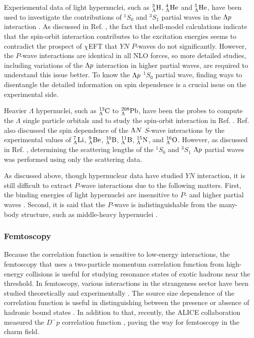 Experiemental data of light hypernuclei, such as ${}_\Lambda^3\rm{H}$, ${}_\Lambda^4\rm{He}$ and ${}_\Lambda^5\rm{He}$, have been used to investigate the contributions of $^1S_0$ and $^3S_1$ partial waves in the $\Lambda p$ interaction \cite{chiEFT-2020}\cite{chiEFT-2020_2}. As discussed in Ref. \cite{chiEFT-2020_2}, the fact that shell-model calculations indicate that the spin-orbit interaction contributes to the excitation energies seems to contradict the prospect of $\chi$EFT that $YN$ $P$-waves do not significantly. However, the $P$-wave interactions are identical in all NLO forces, so more detailed studies, including variations of the $\Lambda p$ interaction in higher partial waves, are required to understand this issue better. To know the $\Lambda p$ $^1S_0$ partial wave, finding ways to disentangle the detailed information on spin dependence is a crucial issue on the experimental side. 

Heavier $\Lambda$ hypernuclei, such as ${}_\Lambda^{13}\rm{C}$ to ${}_\Lambda^{208}\rm{Pb}$, have been the probes to compute the $\Lambda$ single particle orbitals and to study the spin-orbit interaction in Ref. \cite{chiEFT-2009}. Ref. \cite{shell-2005} also discussed the spin dependence of the $\Lambda N$ $S$-wave interactions by the experimental values of ${}_\Lambda^7\rm{Li}$, ${}_\Lambda^9\rm{Be}$, ${}_\Lambda^{10}\rm{B}$, ${}_\Lambda^{11}\rm{B}$, ${}_\Lambda^{15}\rm{N}$, and ${}_\Lambda^{16}\rm{O}$. However, as discussed in Ref. \cite{Lp-1968_Alex}, determining the scattering lengths of the $^1S_0$ and $^3S_1$ $\Lambda p$ partial waves was performed using only the scattering data. %

As discussed above, though hypernuclear data have studied $YN$ interaction, it is still difficult to extract $P$-wave interactions due to the following matters. First, the binding energies of light hypernuclei are insensitive to $P$- and higher partial waves \cite{chiEFT-2020_2}. Second, it is said that the $P$-wave is indistinguishable from the many-body structure, such as middle-heavy hypernuclei \cite{Isaka-2017}. 

\subsubsection{Femtoscopy}
Because the correlation function is sensitive to low-energy interactions, the femtoscopy that uses a two-particle momentum correlation function from high-energy collisions is useful for studying resonance states of exotic hadrons near the threshold. In femtoscopy, various interactions in the strangeness sector have been studied theoretically \cite{fem-th-1, fem-th-2, fem-th-3, fem-th-4, fem-th-5, fem-th-6, fem-th-7, fem-th-8, fem-th-9} and experimentally \cite{fem-ex-1, fem-ex-2, fem-ex-3, fem-ex-4, fem-ex-5, fem-ex-6, fem-ex-7, fem-ex-8, fem-ex-9, fem-ex-10, fem-ex-11, fem-ex-12}. The source size dependence of the correlation function is useful in distinguishing between the presence or absence of hadronic bound states \cite{fem-th-7, fem-th-8}. In addition to that, recently, the ALICE collaboration measured the $D^{-}p$ correlation function \cite{fem-ex-13}, paving the way for femtoscopy in the charm field. 



